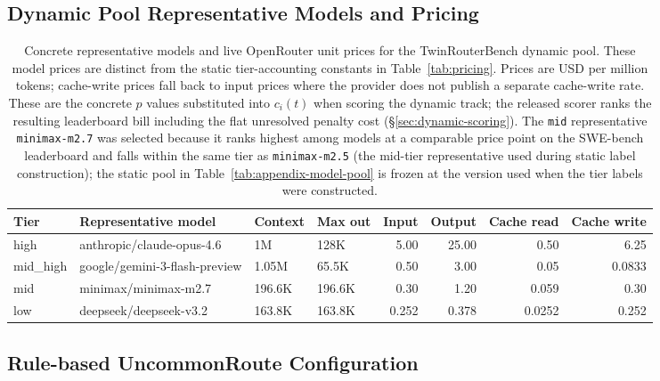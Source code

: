 \subsection{Dynamic Pool Representative Models and Pricing}
\label{app:pricing}

\begin{table}[ht]
\centering
\small
\caption{Concrete representative models and live OpenRouter unit prices for the
TwinRouterBench dynamic pool. These model prices are distinct from the static
tier-accounting constants in Table~\ref{tab:pricing}.
Prices are USD per million tokens; cache-write prices fall back to input prices
where the provider does not publish a separate cache-write rate. These are the
concrete $p$ values substituted into $c_i(t)$ when scoring the dynamic track;
the released scorer ranks the resulting leaderboard bill including the flat
unresolved penalty cost (\S\ref{sec:dynamic-scoring}). The \texttt{mid} representative \texttt{minimax-m2.7} was selected because
it ranks highest among models at a comparable price point on the SWE-bench
leaderboard and falls within the same tier as \texttt{minimax-m2.5} (the
mid-tier representative used during static label construction); the static
pool in Table~\ref{tab:appendix-model-pool} is frozen at the version used when
the tier labels were constructed.}
\label{tab:appendix-pricing}
\begin{adjustbox}{max width=\linewidth}
\begin{tabular}{llllrrrr}
\toprule
Tier & Representative model & Context & Max out & Input & Output & Cache read & Cache write \\
\midrule
high     & anthropic/claude-opus-4.6       & 1M      & 128K   & 5.00  & 25.00 & 0.50   & 6.25  \\
mid\_high & google/gemini-3-flash-preview  & 1.05M   & 65.5K  & 0.50  &  3.00 & 0.05   & 0.0833 \\
mid      & minimax/minimax-m2.7             & 196.6K  & 196.6K & 0.30  &  1.20 & 0.059  & 0.30  \\
low      & deepseek/deepseek-v3.2           & 163.8K  & 163.8K & 0.252 &  0.378 & 0.0252 & 0.252 \\
\bottomrule
\end{tabular}
\end{adjustbox}
\end{table}

\subsection{Rule-based UncommonRoute Configuration}
\label{app:ur-config}

